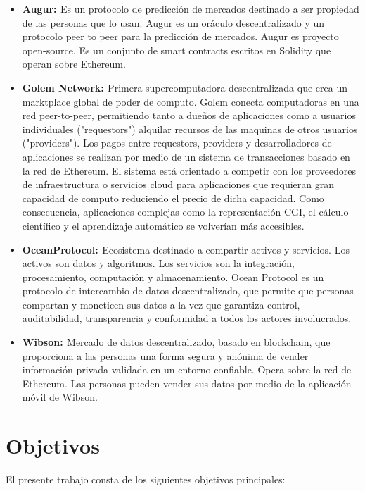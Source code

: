 \documentclass[
11pt, %
oneside, %
spanish, %
singlespacing, %
headsepline, %
chapterinoneline, %
]{MastersDoctoralThesis} %
\begin{document}
\begin{itemize}
\item \textbf{Augur: \cite{aug}} Es un protocolo de predicción de mercados destinado a ser propiedad de las personas que lo usan.
Augur es un oráculo descentralizado y un protocolo peer to peer para la predicción de mercados. Augur es proyecto open-source. Es un conjunto de smart contracts escritos en Solidity que operan sobre Ethereum.


\item \textbf{Golem Network: \cite{gn}} Primera supercomputadora descentralizada que crea un marktplace global de poder de computo.
Golem conecta computadoras en una red peer-to-peer, permitiendo tanto a dueños de aplicaciones como a usuarios individuales ("requestors") alquilar recursos de las maquinas de otros usuarios ("providers"). Los pagos entre requestors, providers y desarrolladores de aplicaciones se realizan por medio de un sistema de transacciones basado en la red de Ethereum. 
El sistema está orientado a competir con los proveedores de infraestructura o servicios cloud para aplicaciones que requieran gran capacidad de computo reduciendo el precio de dicha capacidad. Como consecuencia, aplicaciones complejas como la representación CGI, el cálculo científico y el aprendizaje automático se volverían más accesibles.

\item \textbf{OceanProtocol: \cite{oc}} Ecosistema destinado a compartir activos y servicios. 
Los activos son datos y algoritmos. Los servicios son la integración, procesamiento, computación y almacenamiento. 
Ocean Protocol es un protocolo de intercambio de datos descentralizado, que permite que personas compartan y moneticen sus datos a la vez que garantiza control, auditabilidad, transparencia y conformidad a todos los actores involucrados.

\item \textbf{Wibson: \cite{wib}} Mercado de datos descentralizado, basado en blockchain, que proporciona a las personas una forma segura y anónima de vender información privada validada en un entorno confiable. Opera sobre la red de Ethereum. Las personas pueden vender sus datos por medio de la aplicación móvil de Wibson.
\end{itemize}

\chapter{Objetivos}
El presente trabajo consta de los siguientes objetivos principales:
\end{document}
